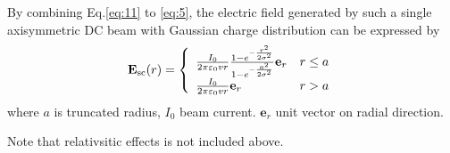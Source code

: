 \documentclass[aps,prstab,twocolumn,superscriptaddress,showpacs]{revtex4}
\newcommand{\bs}[1]{\mathbf #1}
\begin{document}
By combining Eq.{\ref{eq:11} to \ref{eq:5}}, the electric field generated by such a single axisymmetric DC beam with Gaussian charge distribution can be expressed by 
\begin{equation}\label{eq:Esc}
  \bs{E_{\RM{sc}}(r)} = \left\{
    \begin{array}{ll}
      \frac{I_0}{2\pi\varepsilon_0 v r}\frac{1-e^{-\frac{r^2}{2\sigma^2}}}{1-e^{-\frac{a^2}{2\sigma^2}}}\bs{e}_r & r \le a \\
      \frac{I_0}{2\pi\varepsilon_0 v r}\bs{e}_r & r > a
    \end{array}
    \right.
\end{equation}  
where $a$ is truncated radius, $I_0$ beam current. $\bs{e}_r$ unit vector on radial direction. 

Note that relativsitic effects is not included above.
\end{document}
